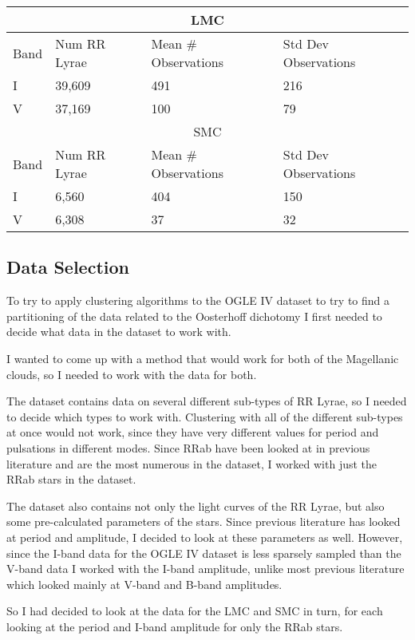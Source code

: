 \documentclass[]{article}
\begin{document}
\begin{center}
	\begin{tabular}{|l|l|l|l|}
		\hline
		\multicolumn{4}{|c|}{LMC} \\
		\hline
		Band & Num RR Lyrae & Mean \# Observations & Std Dev Observations \\
		\hline
		I & 39,609 & 491 & 216 \\
		V & 37,169 & 100 & 79 \\
		\hline
		\multicolumn{4}{|c|}{SMC} \\
		\hline
		Band & Num RR Lyrae & Mean \# Observations & Std Dev Observations \\
		\hline
		I & 6,560 & 404 & 150 \\
		V & 6,308 & 37 & 32 \\		
		\hline
	\end{tabular}
\end{center}

\subsection{Data Selection}
To try to apply clustering algorithms to the OGLE IV dataset to try to find a partitioning of the data related to the Oosterhoff dichotomy I first needed to decide what data in the dataset to work with.

I wanted to come up with a method that would work for both of the Magellanic clouds, so I needed to work with the data for both.

The dataset contains data on several different sub-types of RR Lyrae, so I needed to decide which types to work with. Clustering with all of the different sub-types at once would not work, since they have very different values for period and pulsations in different modes. Since RRab have been looked at in previous literature and are the most numerous in the dataset, I worked with just the RRab stars in the dataset.

The dataset also contains not only the light curves of the RR Lyrae, but also some pre-calculated parameters of the stars. Since previous literature has looked at period and amplitude, I decided to look at these parameters as well. However, since the I-band data for the OGLE IV dataset is less sparsely sampled than the V-band data I worked with the I-band amplitude, unlike most previous literature which looked mainly at V-band and B-band amplitudes.

So I had decided to look at the data for the LMC and SMC in turn, for each looking at the period and I-band amplitude for only the RRab stars.
\end{document}
